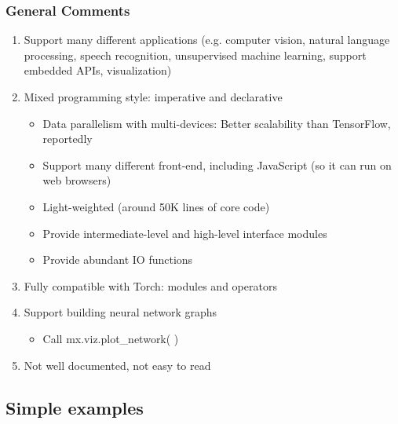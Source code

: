 \begin{frame}
  \MyLogo
  \frametitle{General Comments}  

\begin{enumerate}
%
\item Support many different applications (e.g. computer vision, natural language processing,  speech recognition, unsupervised machine learning, support embedded APIs, visualization)
%
\item Mixed programming style: imperative and declarative
\begin{itemize}
\item Data parallelism with multi-devices: Better scalability than TensorFlow, reportedly
\item Support many different front-end, including JavaScript (so it can run on web browsers)
\item Light-weighted (around 50K lines of core code)
\item Provide intermediate-level and high-level interface modules
\item Provide abundant IO functions 
%
\end{itemize}
%
\item Fully compatible with Torch: modules and operators
%
\item Support building neural network graphs
\begin{itemize}
\item Call mx.viz.plot\_network( )
\end{itemize}
%
\item Not well documented, not easy to read
%
\end{enumerate}

\end{frame}

\subsection{Simple examples}

